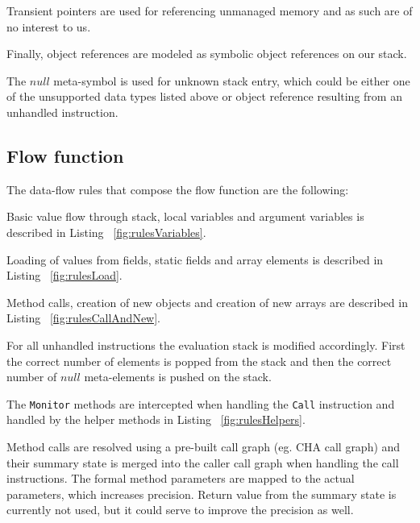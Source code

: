 Transient pointers are used for referencing unmanaged memory and as such are of no interest to us.

Finally, object references are modeled as symbolic object references on our stack.

The $null$ meta-symbol is used for unknown stack entry, which could be either one of the unsupported data types listed above or object reference resulting from an unhandled instruction.

\subsection{Flow function}

The data-flow rules that compose the flow function are the following:
\begin{itemize*}
\item Basic value flow through stack, local variables and argument variables is described in Listing ~\ref{fig:rulesVariables}.
\item Loading of values from fields, static fields and array elements is described in Listing ~\ref{fig:rulesLoad}.
\item Method calls, creation of new objects and creation of new arrays are described in Listing ~\ref{fig:rulesCallAndNew}.
\item For all unhandled instructions the evaluation stack is modified accordingly. First the correct number of elements is popped from the stack and then the correct number of $null$ meta-elements is pushed on the stack.
\end{itemize*}

The \texttt{Monitor} methods are intercepted when handling the \texttt{Call} instruction and handled by the helper methods in Listing ~\ref{fig:rulesHelpers}.

Method calls are resolved using a pre-built call graph (eg. CHA call graph) and their summary state is merged into the caller call graph when handling the call instructions. The formal method parameters are mapped to the actual parameters, which increases precision. Return value from the summary state is currently not used, but it could serve to improve the precision as well. 

